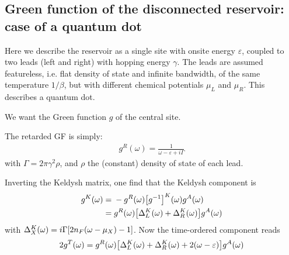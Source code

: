 \documentclass[12pt]{article}
\begin{document}
\begin{appendices}

\section{Green function of the disconnected reservoir: case of a quantum dot}

Here we describe the reservoir as a single site with onsite energy $\varepsilon$, coupled to two leads (left and right) with hopping energy $\gamma$. The leads are assumed featureless, i.e. flat density of state and infinite bandwidth, of the same temperature $1/\beta$, but with different chemical potentials $\mu_L$ and $\mu_R$. This describes a quantum dot.

We want the Green function $g$ of the central site.

The retarded GF is simply:
\begin{eqnarray}
	g^R(\omega) = \frac{1}{\omega - \varepsilon + i\Gamma}
\end{eqnarray}
with $\Gamma = 2\pi\gamma^2\rho$, and $\rho$ the (constant) density of state of each lead.

Inverting the Keldysh matrix, one find that the Keldysh component is
\begin{align}
	g^K(\omega) ={}& - g^R(\omega) \qty[g^{-1}]^K(\omega) g^A(\omega)
	\\
	={}& g^R(\omega) \qty[\Delta^K_L(\omega) + \Delta^K_R(\omega)] g^A(\omega)
\end{align}
with $\Delta^K_X(\omega) = i\Gamma \qty[2 n_F(\omega - \mu_X) - 1]$.
Now the time-ordered component reads
\begin{equation}
	2g^T(\omega) = g^R(\omega) \qty[\Delta^K_L(\omega) + \Delta^K_R(\omega) + 2(\omega - \varepsilon)] g^A(\omega)
\end{equation}

%



\end{appendices}
\end{document}
